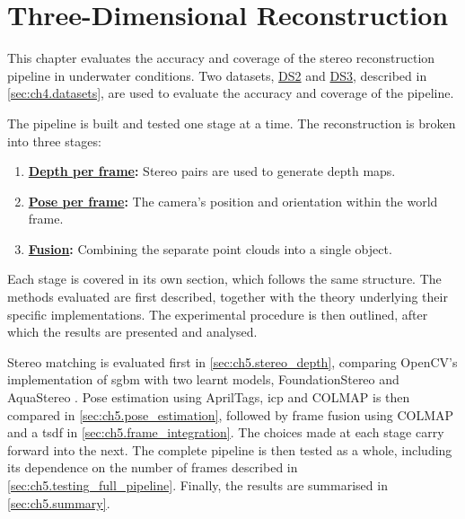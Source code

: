 \chapter{Three-Dimensional Reconstruction}
\label{ch:reconstruction}
This chapter evaluates the accuracy and coverage of the stereo reconstruction pipeline in underwater conditions.
Two datasets, \hyperref[sec:ch4.ds2]{DS2} and \hyperref[sec:ch4.ds3]{DS3}, described in \autoref{sec:ch4.datasets},
are used to evaluate the accuracy and coverage of the pipeline.

The pipeline is built and tested one stage at a time. The reconstruction is broken into three
stages:

\begin{enumerate}
    \item \textbf{\hyperref[sec:ch5.stereo_depth]{Depth per frame}:} Stereo pairs are used to generate depth maps.
    \item \textbf{\hyperref[sec:ch5.pose_estimation]{Pose per frame}:} The camera's position and orientation within the world frame.
    \item  \textbf{\hyperref[sec:ch5.frame_integration]{Fusion}:} Combining the separate point clouds into a single object.
\end{enumerate}

Each stage is covered in its own section, which follows the same structure. The methods evaluated are first described,
 together with the theory underlying their specific
implementations. The experimental procedure is then outlined, after which the results are presented and analysed.


Stereo matching is evaluated first in \autoref{sec:ch5.stereo_depth}, comparing OpenCV's implementation of
\gls{sgbm} \cite{hirschmullerStereoProcessingSemiglobal2008} with two learnt models,
FoundationStereo \cite{wenFoundationStereoZeroShotStereo2025} and AquaStereo
\cite{weiAquaStereoEnablingUnderwater2026}. Pose estimation using AprilTags, \gls{icp} and COLMAP is then compared
in \autoref{sec:ch5.pose_estimation}, followed by frame fusion using COLMAP and a \gls{tsdf}
in \autoref{sec:ch5.frame_integration}. The choices made at each stage carry forward into the next. The complete
pipeline is then tested as a whole, including its dependence on the number of frames
described in \autoref{sec:ch5.testing_full_pipeline}. Finally, the results are summarised in \autoref{sec:ch5.summary}.



